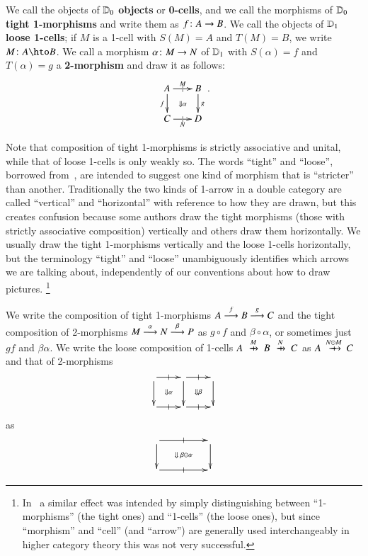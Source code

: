 We call the objects of $\lD_0$ \textbf{objects} or \textbf{0-cells},
and we call the morphisms of $\lD_0$ \textbf{tight 1-morphisms}
and write them as $f\maps A\to B$.  We call the objects of $\lD_1$
\textbf{loose 1-cells}; if $M$ is a 1-cell with $S(M)=A$ and
$T(M)=B$, we write $M\maps A\hto B$.  We call a morphism $\alpha\maps
M\to N$ of $\lD_1$ with $S(\alpha)=f$ and $T(\alpha)=g$ a
\textbf{2-morphism} and draw it as follows:
\begin{equation}\label{eq:square}
  \xymatrix@-.5pc{
    A \ar[r]|{|}^{M}  \ar[d]_f \ar@{}[dr]|{\Downarrow\alpha}&
    B\ar[d]^g\\
    C \ar[r]|{|}_N & D
  }.
\end{equation}


Note that composition of tight 1-morphisms is strictly associative and unital, while that of loose 1-cells is only weakly so.
The words ``tight'' and ``loose'', borrowed from~\cite{ls:limlax}, are intended to suggest one kind of morphism that is ``stricter'' than another.
Traditionally the two kinds of 1-arrow in a double category are called ``vertical'' and ``horizontal'' with reference to how they are drawn, but this creates confusion because some authors draw the tight morphisms (those with strictly associative composition) vertically and others draw them horizontally.
We usually draw the tight 1-morphisms vertically and the loose 1-cells horizontally, but the terminology ``tight'' and ``loose'' unambiguously identifies which arrows we are talking about, independently of our conventions about how to draw pictures.%
\footnote{In~\cite{shulman:smbicat} a similar effect was intended by simply distinguishing between ``1-morphisms'' (the tight ones) and ``1-cells'' (the loose ones), but since ``morphism'' and ``cell'' (and ``arrow'') are generally used interchangeably in higher category theory this was not very successful.}

We write the composition of tight 1-morphisms $A\too[f] B\too[g] C$
and the tight composition of 2-morphisms $M\too[\alpha]
N\too[\beta] P$ as $g\circ f$ and $\beta\circ\alpha$, or sometimes
just $gf$ and $\beta\alpha$.  We write the loose composition of
1-cells $A\xhto{M} B \xhto{N} C$ as $A\xhto{N\odot M} C$ and that of
2-morphisms
\[\vcenter{\xymatrix{ \ar[r]|-@{|}^-{} \ar[d] \ar@{}[dr]|{\Downarrow\alpha} &
     \ar[r]|-@{|}^-{} \ar[d] \ar@{}[dr]|{\Downarrow\beta} &\ar[d]\\
  \ar[r]|-@{|}_-{} & \ar[r]|-@{|}_-{} & }}\]
as
\[\vcenter{\xymatrix@C=4pc{ \ar[r]|-@{|}^-{} \ar[d] \ar@{}[dr]|{\Downarrow\;\be\odot\al} &  \ar[d]\\
  \ar[r]|-@{|}_-{} & }}\]


